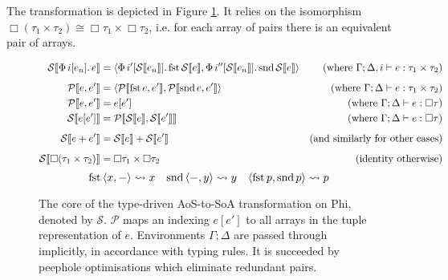 The transformation is depicted in Figure \ref{fig:aos-to-soa}. 
It relies on the isomorphism $\Box (\tau_1 \times \tau_2) \cong \Box \tau_1 \times \Box \tau_2$, i.e. for each array of pairs there is an equivalent pair of arrays. 



\newcommand{\phisoa}[1]{\mathcal S \left\llbracket {#1} \right\rrbracket}
\newcommand{\phitupleindex}[2]{\mathcal P \left\llbracket {#1}, {#2} \right\rrbracket}

\begin{figure}[h]
    \centering
    \begin{align*}
\phisoa {\phivec{i}{e_n}{e}}
&= \phipair{\phivec{i'}{\phisoa{e_n}}{\phifst{\phisoa{e}}}}{\phivec{i''}{\phisoa{e_n}}{\phisnd{\phisoa{e}}}}
&\text{(where }\Gamma; \Delta, i \vdash e : \phipairtype{\tau_1}{\tau_2} \text{)} \\[0.5em]
\phitupleindex{e}{e'}
&= \phipair{\phitupleindex{\phifst{e}}{e'}}{\phitupleindex{\phisnd{e}}{e'}}
&\text{(where }\Gamma; \Delta \vdash e : \phipairtype{\tau_1}{\tau_2} \text{)} \\
\phitupleindex{e}{e'}
&= e\left[ e' \right]
&\text{(where }\Gamma; \Delta \vdash e : \phivectype{\tau} \text{)} \\
\phisoa{e[e']}
&= \phitupleindex{\phisoa{e}}{\phisoa{e'}}
&\text{(where }\Gamma; \Delta \vdash e : \phivectype{\tau} \text{)} \\[0.5em]
\phisoa{e + e'}
&= \phisoa{e} + \phisoa{e'}
&\text{(and similarly for other cases)} \\[0.5em]
\phisoa{\phivectype{(\phipairtype{\tau_1}{\tau_2}})} &= \phipairtype{\phivectype{\tau_1}}{\phivectype{\tau_2}} &\text{(identity otherwise)}
    \end{align*}
$$ \phifst{\phipair{x}{-}} \leadsto x \quad \phisnd{\phipair{-}{y}} \leadsto y \quad \phipair{\phifst{p}}{\phisnd{p}} \leadsto p $$
    \caption{The core of the type-driven AoS-to-SoA transformation on Phi, denoted by $\mathcal S$. $\mathcal P$ maps an indexing $e[e']$ to all arrays in the tuple representation of $e$. Environments $\Gamma; \Delta$ are passed through implicitly, in accordance with typing rules. It is succeeded by peephole optimisations which eliminate redundant pairs.}
    \label{fig:aos-to-soa}
\end{figure}


